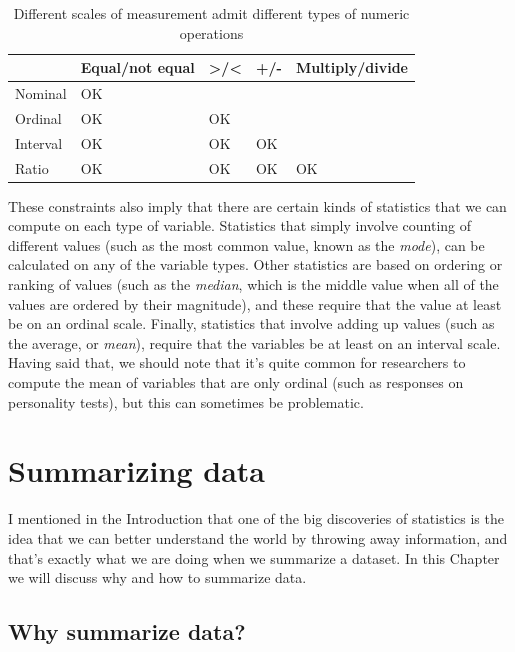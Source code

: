 \documentclass[12pt,]{book}
\theoremstyle{definition}
\theoremstyle{definition}
\theoremstyle{definition}
\theoremstyle{remark}
\begin{document}
\begin{table}

\caption{\label{tab:MeasurementTypes}Different scales of measurement admit different types of numeric operations}
\centering
\begin{tabular}[t]{lllll}
\toprule
  & Equal/not equal & >/< & +/- & Multiply/divide\\
\midrule
Nominal & OK &  &  & \\
Ordinal & OK & OK &  & \\
Interval & OK & OK & OK & \\
Ratio & OK & OK & OK & OK\\
\bottomrule
\end{tabular}
\end{table}

These constraints also imply that there are certain kinds of statistics that we can compute on each type of variable. Statistics that simply involve counting of different values (such as the most common value, known as the \emph{mode}), can be calculated on any of the variable types. Other statistics are based on ordering or ranking of values (such as the \emph{median}, which is the middle value when all of the values are ordered by their magnitude), and these require that the value at least be on an ordinal scale. Finally, statistics that involve adding up values (such as the average, or \emph{mean}), require that the variables be at least on an interval scale. Having said that, we should note that it's quite common for researchers to compute the mean of variables that are only ordinal (such as responses on personality tests), but this can sometimes be problematic.

\hypertarget{summarizing-data}{%
\chapter{Summarizing data}\label{summarizing-data}}

I mentioned in the Introduction that one of the big discoveries of statistics is the idea that we can better understand the world by throwing away information, and that's exactly what we are doing when we summarize a dataset.
In this Chapter we will discuss why and how to summarize data.

\hypertarget{why-summarize-data}{%
\section{Why summarize data?}\label{why-summarize-data}}
\end{document}
